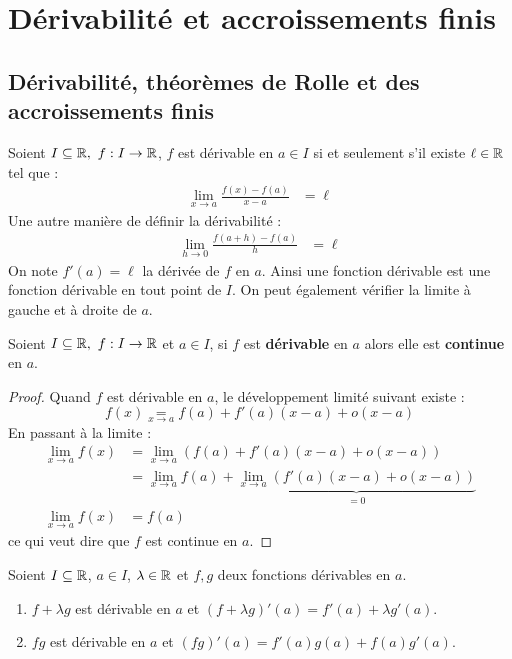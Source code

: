 \chapter{Dérivabilité et accroissements finis}
\def\arraystretch{1}

\section{Dérivabilité, théorèmes de Rolle et des accroissements finis}
\begin{definition}
	Soient $I \subseteq \mathbb{R},\ f : I \to \mathbb{R}$, $f$ est dérivable en $a \in I$ si et seulement s'il existe $\ell \in \mathbb{R}$ tel que :
	\begin{align*}
		  \lim_{x \to a} \frac{f(x) - f(a)}{x - a} &= \ell
	\end{align*}
    Une autre manière de définir la dérivabilité :
    \begin{align*}
        \lim_{h \to 0} \frac{f(a + h) - f(a)}{h} &= \ell
    \end{align*}
	On note $f'(a) = \ell$ la dérivée de $f$ en $a$.
	Ainsi une fonction dérivable est une fonction dérivable en tout point de $I$.
	On peut également vérifier la limite à gauche et à droite de $a$.
\end{definition}

\begin{proposition}
	Soient $I \subseteq \mathbb{R},\ f : I \to \mathbb{R}$ et $a \in I$, si $f$ est \textbf{dérivable} en $a$ alors elle est \textbf{continue} en $a$.
\end{proposition}

\begin{proof}
	Quand $f$ est dérivable en $a$, le développement limité suivant existe :
	\[ f(x) \underset{x \to a}{=} f(a) + f'(a)(x - a) + o(x - a) \]
	En passant à la limite :
	\begin{align*}
		\lim_{x \to a} f(x) &= \lim_{x \to a} \left( f(a) + f'(a)(x - a) + o(x - a) \right) \\
		&= \lim_{x \to a} f(a) + \underbrace{\lim_{x \to a} \left( f'(a)(x - a) + o(x - a) \right)}_{= 0} \\
		\lim_{x \to a} f(x) &= f(a)
	\end{align*}
	ce qui veut dire que $f$ est continue en $a$.
\end{proof}

\begin{theorem}
	Soient $I \subseteq \mathbb{R}$, $a \in I$, $\lambda \in \mathbb{R}$ et $f, g$ deux fonctions dérivables en $a$.
	\begin{enumerate}
		\item $f + \lambda g$ est dérivable en $a$ et $(f + \lambda g)'(a) = f'(a) + \lambda g'(a)$.
		\item $f g$ est dérivable en $a$ et $(fg)'(a) = f'(a) g(a) + f(a) g'(a)$.
	\end{enumerate}
\end{theorem}

